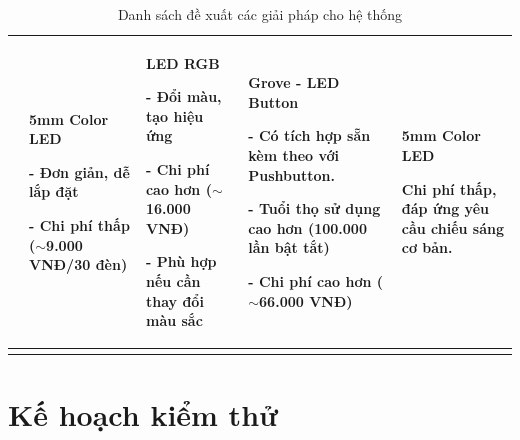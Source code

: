 {\begin{longtable}{|p{2.3cm}|p{3.2cm}|p{3.2cm}|p{3.2cm}|p{3.5cm}|}
& \textbf{5mm Color LED}


- Đơn giản, dễ lắp đặt


- Chi phí thấp ($\sim$9.000 VNĐ/30 đèn) 

& \textbf{LED RGB}


- Đổi màu, tạo hiệu ứng


- Chi phí cao hơn ($\sim$16.000 VNĐ)


- Phù hợp nếu cần thay đổi màu sắc 

& \textbf{Grove - LED Button}


- Có tích hợp sẵn kèm theo với Pushbutton.


- Tuổi thọ sử dụng cao hơn (100.000 lần bật tắt)


- Chi phí cao hơn ($\sim$66.000 VNĐ) 

& \textbf{5mm Color LED}


Chi phí thấp, đáp ứng yêu cầu chiếu sáng cơ bản. \\ \hline

\caption{Danh sách đề xuất các giải pháp cho hệ thống}
\label{}
\end{longtable}

}

\pagebreak
\section{Kế hoạch kiểm thử}
